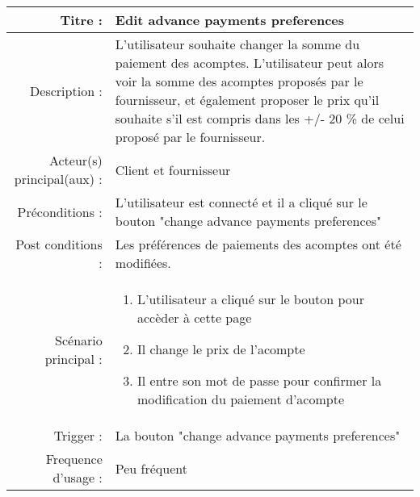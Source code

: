 \documentclass[../rapport.tex]{subfiles}
\begin{document}
\begin{tabular}{|r|p{9cm}|}
    \hline
    Titre : & Edit advance payments preferences \\
    \hline
    Description : & L'utilisateur souhaite changer la somme du paiement des acomptes. L'utilisateur peut alors voir la somme des acomptes proposés par le fournisseur, et également proposer le prix qu'il souhaite s'il est compris dans les +/- 20 \% de celui proposé par le fournisseur. \\
    \hline
    Acteur(s) principal(aux) : & Client et fournisseur\\
    \hline
    Préconditions : & L'utilisateur est connecté et il a cliqué sur le bouton "change advance payments preferences"\\
    \hline 
    Post conditions : & Les préférences de paiements des acomptes ont été modifiées.\\
    \hline 
    Scénario principal : & \begin{enumerate}
        \item L'utilisateur a cliqué sur le bouton pour accèder à cette page
        \item Il change le prix de l'acompte
        \item Il entre son mot de passe pour confirmer la modification du paiement d'acompte
    \end{enumerate} \nointerlineskip \\
    \hline
    Trigger : & La bouton "change advance payments preferences"\\
    \hline
    Frequence d'usage : & Peu fréquent\\
    \hline
\end{tabular}
\\ \\ \\
\end{document}
